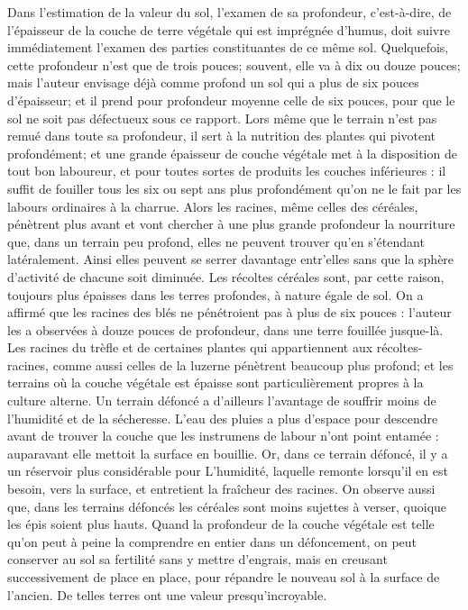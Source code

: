 Dans l'estimation de la valeur du sol, l'examen de sa profondeur, c'est-à-dire, de l'épaisseur de la couche de terre végétale qui est imprégnée d'humus, doit suivre immédiatement l'examen des parties constituantes de ce même sol. Quelquefois, cette profondeur n'est que de trois pouces; souvent, elle va à dix ou douze pouces; mais l'auteur envisage déjà comme profond un sol qui a plus de six pouces d'épaisseur; et il prend pour profondeur moyenne celle de six pouces, pour que le sol ne soit pas défectueux sous ce rapport.
Lors même que le terrain n'est pas remué dans toute sa profondeur, il sert à la nutrition des plantes qui pivotent profondément; et une grande épaisseur de couche végétale met à la disposition de tout bon laboureur, et pour toutes sortes de produits les couches inférieures : il suffit de fouiller tous les six ou sept ans plus profondément qu'on ne le fait par les labours ordinaires\setcounter{page}{131} à la charrue. Alors les racines, même celles des céréales, pénètrent plus avant et vont chercher à une plus grande profondeur la nourriture que, dans un terrain peu profond, elles ne peuvent trouver qu'en s'étendant latéralement. Ainsi elles peuvent se serrer davantage entr'elles sans que la sphère d'activité de chacune soit diminuée. Les récoltes céréales sont, par cette raison, toujours plus épaisses dans les terres profondes, à nature égale de sol. On a affirmé que les racines des blés ne pénétroient pas à plus de six pouces : l'auteur les a observées à douze pouces de profondeur, dans une terre fouillée jusque-là. Les racines du trèfle et de certaines plantes qui appartiennent aux récoltes-racines, comme aussi celles de la luzerne pénètrent beaucoup plus profond; et les terrains où la couche végétale est épaisse sont particulièrement propres à la culture alterne.
Un terrain défoncé a d'ailleurs l'avantage de souffrir moins de l'humidité et de la sécheresse. L'eau des pluies a plus d'espace pour descendre avant de trouver la couche que les instrumens de labour n'ont point entamée : auparavant elle mettoit la surface en bouillie. Or, dans ce terrain défoncé, il y a un réservoir plus considérable pour\setcounter{page}{132} L'humidité, laquelle remonte lorsqu'il en est besoin, vers la surface, et entretient la fraîcheur des racines. On observe aussi que, dans les terrains défoncés les céréales sont moins sujettes à verser, quoique les épis soient plus hauts.
Quand la profondeur de la couche végétale est telle qu'on peut à peine la comprendre en entier dans un défoncement, on peut conserver au sol sa fertilité sans y mettre d'engrais, mais en creusant successivement de place en place, pour répandre le nouveau sol à la surface de l'ancien. De telles terres ont une valeur presqu'incroyable.
